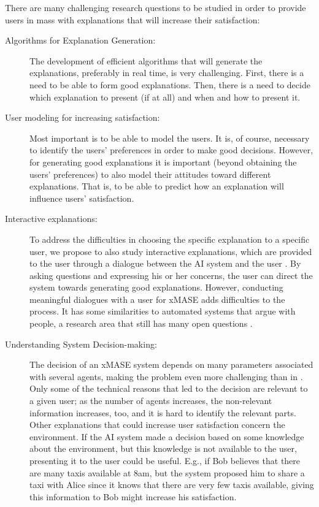 \documentclass[letterpaper]{article} %
\begin{document}
{{There are many challenging research questions to be studied in order to provide users in \acp{mas} with explanations that will increase their satisfaction:

\begin{description}
\item[Algorithms for Explanation Generation:] The develop\-ment of efficient algorithms that will generate the explanations, preferably in real time, is very challenging. First, there is a need to be able to form good explanations. Then, there is a need to decide which explanation to present (if at all) and when and how to present it.
\item[User modeling for increasing satisfaction:] Most important is to be able to model the users. It is, of course, necessary to identify the users' preferences in order to make good decisions. However, for generating good explanations it is important (beyond obtaining the users' preferences) to also model their attitudes toward different explanations. That is, to be able to predict how an explanation will influence users' satisfaction.
\item[Interactive explanations:]
To address the difficulties in choosing the specific explanation to a specific user, we propose  to also study interactive explanations, which are provided to the user through a dialogue between the AI system and the user \cite{miller2018explanation}. By asking questions and expressing his or her concerns, the user can direct the system towards generating good explanations. However, conducting meaningful dialogues with a user for \ac{xMASE} adds difficulties to the process. It has some similarities to automated systems that argue with people, a research area that still has many open questions \cite{rosenfeld2016providing,rosenfeld2016strategical}.
\item[Understanding System Decision-making:] The decision of an \ac{xMASE} system depends on many parameters associated with several agents, making the problem even more challenging than in \ac{. Only some of the technical reasons that led to the decision are relevant to a given user; as the number of agents increases, the non-relevant information increases, too, and it is hard to identify the relevant parts. Other explanations that could increase user satisfaction concern the environment. If the AI system made a decision based on some knowledge about the environment, but this knowledge is not available to the user, presenting it to the user could be useful. E.g., if Bob believes that there are many taxis available at 8am, but the system proposed him to share a taxi with Alice since it knows that there are very few taxis available, giving this information to Bob might increase his satisfaction.
}
\end{description}}}
\end{document}
